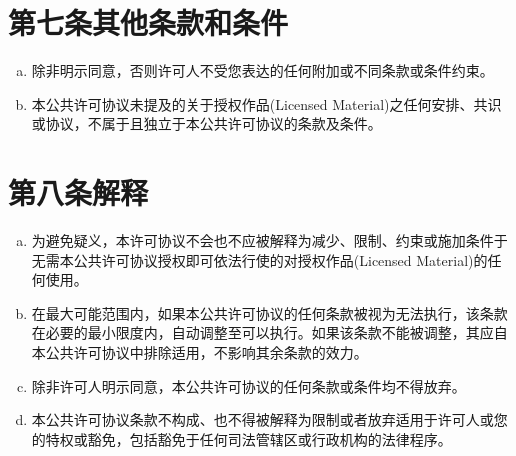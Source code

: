 \section*{第七条\;其他条款和条件} \label{section:A.7}

\begin{enumerate}[a.]
    \item 除非明示同意，否则许可人不受您表达的任何附加或不同条款或条件约束。\label{entry:A.7.a}
    \item 本公共许可协议未提及的关于授权作品(Licensed Material)之任何安排、共识或协议，不属于且独立于本公共许可协议的条款及条件。\label{entry:A.7.b}
\end{enumerate}

\section*{第八条\;解释} \label{section:A.8}

\begin{enumerate}[a.]
    \item 为避免疑义，本许可协议不会也不应被解释为减少、限制、约束或施加条件于无需本公共许可协议授权即可依法行使的对授权作品(Licensed Material)的任何使用。\label{entry:A.8.a}
    \item 在最大可能范围内，如果本公共许可协议的任何条款被视为无法执行，该条款在必要的最小限度内，自动调整至可以执行。如果该条款不能被调整，其应自本公共许可协议中排除适用，不影响其余条款的效力。\label{entry:A.8.b}
    \item 除非许可人明示同意，本公共许可协议的任何条款或条件均不得放弃。\label{entry:A.8.c}
    \item 本公共许可协议条款不构成、也不得被解释为限制或者放弃适用于许可人或您的特权或豁免，包括豁免于任何司法管辖区或行政机构的法律程序。\label{entry:A.8.d}
\end{enumerate}
